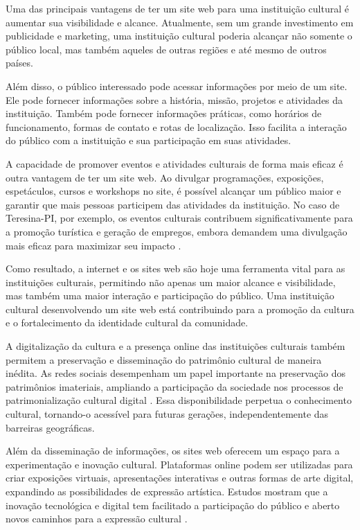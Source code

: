Uma das principais vantagens de ter um site web para uma instituição cultural é aumentar sua visibilidade e alcance. Atualmente, sem um grande investimento em publicidade e marketing, uma instituição cultural poderia alcançar não somente o público local, mas também aqueles de outras regiões e até mesmo de outros países.

Além disso, o público interessado pode acessar informações por meio de um site. Ele pode fornecer informações sobre a história, missão, projetos e atividades da instituição. Também pode fornecer informações práticas, como horários de funcionamento, formas de contato e rotas de localização. Isso facilita a interação do público com a instituição e sua participação em suas atividades.

A capacidade de promover eventos e atividades culturais de forma mais eficaz é outra vantagem de ter um site web. Ao divulgar programações, exposições, espetáculos, cursos e workshops no site, é possível alcançar um público maior e garantir que mais pessoas participem das atividades da instituição. No caso de Teresina-PI, por exemplo, os eventos culturais contribuem significativamente para a promoção turística e geração de empregos, embora demandem uma divulgação mais eficaz para maximizar seu impacto \cite{gomes2009}.

Como resultado, a internet e os sites web são hoje uma ferramenta vital para as instituições culturais, permitindo não apenas um maior alcance e visibilidade, mas também uma maior interação e participação do público. Uma instituição cultural desenvolvendo um site web está contribuindo para a promoção da cultura e o fortalecimento da identidade cultural da comunidade.

A digitalização da cultura e a presença online das instituições culturais também permitem a preservação e disseminação do patrimônio cultural de maneira inédita. As redes sociais desempenham um papel importante na preservação dos patrimônios imateriais, ampliando a participação da sociedade nos processos de patrimonialização cultural digital \cite{ramires2019}. Essa disponibilidade perpetua o conhecimento cultural, tornando-o acessível para futuras gerações, independentemente das barreiras geográficas.

Além da disseminação de informações, os sites web oferecem um espaço para a experimentação e inovação cultural. Plataformas online podem ser utilizadas para criar exposições virtuais, apresentações interativas e outras formas de arte digital, expandindo as possibilidades de expressão artística. Estudos mostram que a inovação tecnológica e digital tem facilitado a participação do público e aberto novos caminhos para a expressão cultural \cite{lu2023}.

